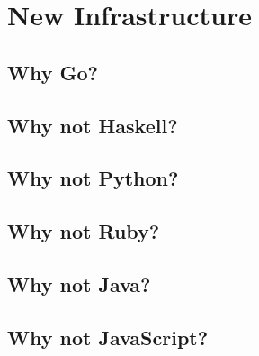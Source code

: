 \section{New Infrastructure}

\subsection{Why Go?}

\subsection{Why not Haskell?}

\subsection{Why not Python?}

\subsection{Why not Ruby?}

\subsection{Why not Java?}

\subsection{Why not JavaScript?}
